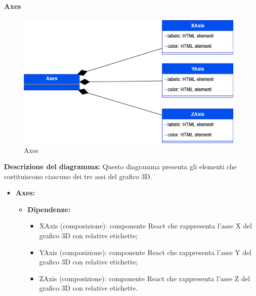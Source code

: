 \paragraph{Axes}
\begin{figure}[h!] \centering
    \includegraphics[scale=0.45]{template/images/uml_front/ui/axes.png}
    \caption{Axes}
\end{figure}
\textbf{Descrizione del diagramma:}
Questo diagramma presenta gli elementi che costituiscono ciascuno dei tre assi del grafico 3D.
\begin{itemize}
    \item \textbf{Axes:}
    \begin{itemize}
        \item \textbf{Dipendenze:}
        \begin{itemize}
            \item XAxis (composizione): componente React che rappresenta l'asse X del grafico 3D con relative etichette;
            \item YAxis (composizione): componente React che rappresenta l'asse Y del grafico 3D con relative etichette;
            \item ZAxis (composizione): componente React che rappresenta l'asse Z del grafico 3D con relative etichette.
        \end{itemize} 
    \end{itemize}
\end{itemize}